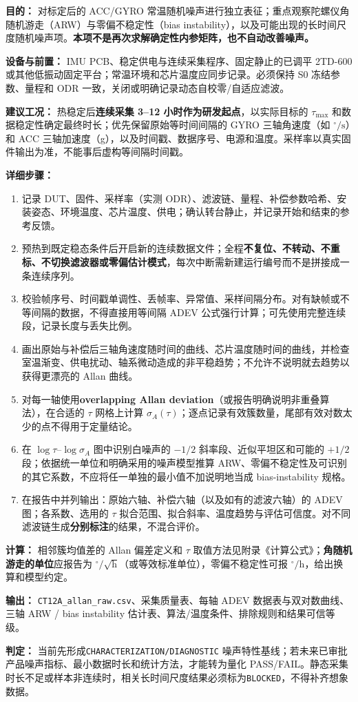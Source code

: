 \textbf{目的：} 对标定后的 ACC/GYRO 常温随机噪声进行独立表征；重点观察陀螺仪角随机游走（ARW）与零偏不稳定性（bias instability），以及可能出现的长时间尺度随机噪声项。\textbf{本项不是再次求解确定性内参矩阵，也不自动改善噪声。}
\par\textbf{设备与前置：} IMU PCB、稳定供电与连续采集程序、固定静止的已调平 2TD-600 或其他低振动固定平台；常温环境和芯片温度应同步记录。必须保持 S0 冻结参数、量程和 ODR 一致，关闭或明确记录动态自校零/自适应滤波。
\par\textbf{建议工况：} 热稳定后\textbf{连续采集 3--12 小时作为研发起点}，以实际目标的 $\tau_{\max}$ 和数据稳定性确定最终时长；优先保留原始等时间间隔的 GYRO 三轴角速度（如 $^\circ/\mathrm s$）和 ACC 三轴加速度（g），以及时间戳、数据序号、电源和温度。采样率以真实固件输出为准，不能事后虚构等间隔时间戳。
\par\textbf{详细步骤：}
\begin{enumerate}
\item 记录 DUT、固件、采样率（实测 ODR）、滤波链、量程、补偿参数哈希、安装姿态、环境温度、芯片温度、供电；确认转台静止，并记录开始和结束的参考反馈。
\item 预热到既定稳态条件后开启新的连续数据文件；全程\textbf{不复位、不转动、不重标、不切换滤波器或零偏估计模式}，每次中断需新建运行编号而不是拼接成一条连续序列。
\item 校验帧序号、时间戳单调性、丢帧率、异常值、采样间隔分布。对有缺帧或不等间隔的数据，不得直接用等间隔 ADEV 公式强行计算；可先使用完整连续段，记录长度与丢失比例。
\item 画出原始与补偿后三轴角速度随时间的曲线、芯片温度随时间的曲线，并检查室温渐变、供电扰动、轴系微动造成的非平稳趋势；不允许不说明就去趋势以获得更漂亮的 Allan 曲线。
\item 对每一轴使用\textbf{overlapping Allan deviation}（或报告明确说明非重叠算法），在合适的 $\tau$ 网格上计算 $\sigma_A(\tau)$；逐点记录有效簇数量，尾部有效对数太少的点不得用于定量结论。
\item 在 $\log\tau$--$\log\sigma_A$ 图中识别白噪声的 $-1/2$ 斜率段、近似平坦区和可能的 $+1/2$ 段；依据统一单位和明确采用的噪声模型推算 ARW、零偏不稳定性及可识别的其它系数，不应将任一单独的最小值不加说明地当成 bias-instability 规格。
\item 在报告中并列输出：原始六轴、补偿六轴（以及如有的滤波六轴）的 ADEV 图；各系数、选用的 $\tau$ 拟合范围、拟合斜率、温度趋势与评估可信度。对不同滤波链生成\textbf{分别标注}的结果，不混合评价。
\end{enumerate}
\textbf{计算：} 相邻簇均值差的 Allan 偏差定义和 $\tau$ 取值方法见附录《计算公式》；\textbf{角随机游走的单位}应报告为 $^\circ/\sqrt{\mathrm h}$（或等效标准单位），零偏不稳定性可报 $^\circ/\mathrm h$，给出换算和模型约定。
\par\textbf{输出：} \texttt{CT12A\_allan\_raw.csv}、采集质量表、每轴 ADEV 数据表与双对数曲线、三轴 ARW / bias instability 估计表、算法/温度条件、排除规则和结果可信等级。
\par\textbf{判定：} 当前先形成\texttt{CHARACTERIZATION/DIAGNOSTIC} 噪声特性基线；若未来已审批产品噪声指标、最小数据时长和统计方法，才能转为量化 PASS/FAIL。静态采集时长不足或样本非连续时，相关长时间尺度结果必须标为\texttt{BLOCKED}，不得补齐想象数据。

